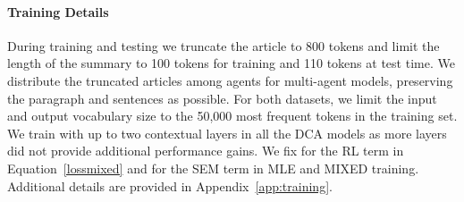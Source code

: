 \documentclass[11pt,a4paper]{article}
\begin{document}
\paragraph{Training Details}
During training and testing we truncate the
article to 800 tokens and limit the length of the
summary to 100 tokens for training and 110 tokens
at test time. We distribute the truncated articles among agents for multi-agent models, preserving the paragraph and sentences as possible. 
For both datasets, we limit the input and output vocabulary size to the 50,000 most frequent tokens in the training set. 
We train with up to two contextual layers in all the DCA models as more layers did not provide additional performance gains.
We fix  for the RL term in Equation~\eqref{lossmixed} and  for the SEM term in MLE and MIXED training. Additional details are provided in Appendix~\ref{app:training}.
\end{document}
